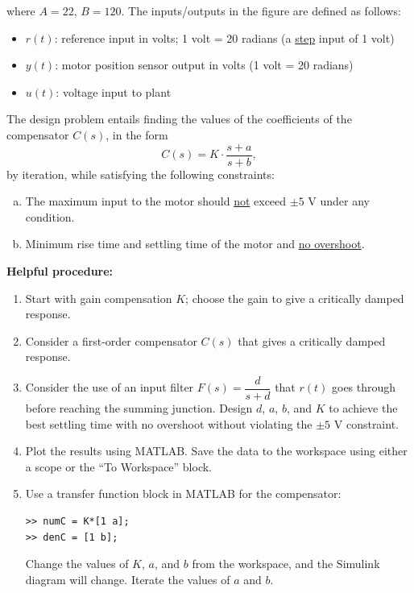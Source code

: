\documentclass[12pt]{article}
\begin{document}
    where $A = 22$, $B = 120$. The inputs/outputs in the figure are defined as follows:
    \begin{itemize}
        \item $r(t)$: reference input in volts; 1 volt = 20 radians (a \underline{step} input of 1 volt)
        \item $y(t)$: motor position sensor output in volts (1 volt = 20 radians)
        \item $u(t)$: voltage input to plant
    \end{itemize}

    The design problem entails finding the values of the coefficients of the compensator $C(s)$, in the form
    \[
        C(s) = K \cdot \frac{s+a}{s+b},
    \]
    by iteration, while satisfying the following constraints:
    \begin{enumerate}[(a)]
        \item The maximum input to the motor should \underline{not} exceed $\pm 5$ V under any condition.
        \item Minimum rise time and settling time of the motor and \underline{no overshoot}.
    \end{enumerate}

    \textbf{Helpful procedure:}
    \begin{enumerate}[1.]
        \item Start with gain compensation $K$; choose the gain to give a critically damped response.
        \item Consider a first-order compensator $C(s)$ that gives a critically damped response.
        \item Consider the use of an input filter $F(s) = \dfrac{d}{s+d}$ that $r(t)$ goes through before reaching the summing junction. Design $d$, $a$, $b$, and $K$ to achieve the best settling time with no overshoot without violating the $\pm 5$ V constraint.
        \item Plot the results using MATLAB. Save the data to the workspace using either a scope or the ``To Workspace'' block.
        \item Use a transfer function block in MATLAB for the compensator:
\begin{verbatim}
>> numC = K*[1 a];
>> denC = [1 b];
\end{verbatim}
        Change the values of $K$, $a$, and $b$ from the workspace, and the Simulink diagram will change. Iterate the values of $a$ and $b$.
    \end{enumerate}
\end{document}
